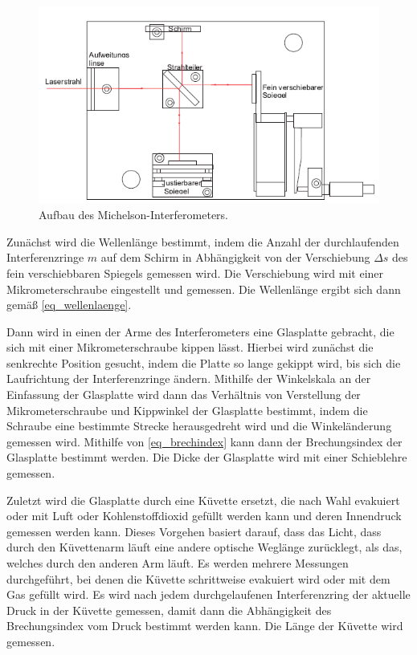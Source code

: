 \documentclass[
	a4paper,
	12pt,
	pagesize,
	ngerman
]{scrartcl}
\begin{document}
	\begin{figure}[H]
		\includegraphics[width=\textwidth]{images/michelson_aufbau}
		\centering
		\caption{Aufbau des Michelson-Interferometers. \cite{Anleitung}}
		\label{fig_aufbau}
	\end{figure}

	Zunächst wird die Wellenlänge bestimmt, indem die Anzahl der durchlaufenden Interferenzringe $m$ auf dem Schirm in Abhängigkeit von der Verschiebung $\Delta s$ des fein verschiebbaren Spiegels gemessen wird. %
	Die Verschiebung wird mit einer Mikrometerschraube eingestellt und gemessen.
	Die Wellenlänge ergibt sich dann gemäß \cref{eq_wellenlaenge}.


	Dann wird in einen der Arme des Interferometers eine Glasplatte gebracht, die sich mit einer Mikrometerschraube kippen lässt. %
	Hierbei wird zunächst die senkrechte Position gesucht, indem die Platte so lange gekippt wird, bis sich die Laufrichtung der Interferenzringe ändern.
	Mithilfe der Winkelskala an der Einfassung der Glasplatte wird dann das Verhältnis von Verstellung der Mikrometerschraube und Kippwinkel der Glasplatte bestimmt, indem die Schraube eine bestimmte Strecke herausgedreht wird und die Winkeländerung gemessen wird.
	Mithilfe von \cref{eq_brechindex} kann dann der Brechungsindex der Glasplatte bestimmt werden.
	Die Dicke der Glasplatte wird mit einer Schieblehre gemessen.

	Zuletzt wird die Glasplatte durch eine Küvette ersetzt, die nach Wahl evakuiert oder mit Luft oder Kohlenstoffdioxid gefüllt werden kann und deren Innendruck gemessen werden kann.
	Dieses Vorgehen basiert darauf, dass das Licht, dass durch den Küvettenarm läuft eine andere optische Weglänge zurücklegt, als das, welches durch den anderen Arm läuft.
	Es werden mehrere Messungen durchgeführt, bei denen die Küvette schrittweise evakuiert wird oder mit dem Gas gefüllt wird.
	Es wird nach jedem durchgelaufenen Interferenzring der aktuelle Druck in der Küvette gemessen, damit dann die Abhängigkeit des Brechungsindex vom Druck bestimmt werden kann.
	Die Länge der Küvette wird gemessen.
\end{document}
